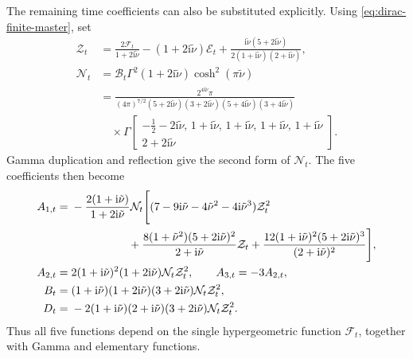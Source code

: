 \documentclass[a4paper,12pt]{article}
\def\ii{\mathrm{i}}
\begin{document}
The remaining time coefficients can also be substituted explicitly.
Using \eqref{eq:dirac-finite-master}, set
\begin{align}
 \mathcal Z_t&=\frac{2\mathcal F_t}{1+2\ii\tilde\nu}
 -(1+2\ii\tilde\nu)\mathcal E_t
 +\frac{\ii\tilde\nu(5+2\ii\tilde\nu)}
 {2(1+\ii\tilde\nu)(2+\ii\tilde\nu)},\nonumber\\
 \mathcal N_t&=\mathcal B_t\Gamma^2(1+2\ii\tilde\nu)
 \cosh^2(\pi\tilde\nu)\nonumber\\
 &=\frac{2^{4\ii\tilde\nu}\pi}
 {(4\pi)^{7/2}
 (5+2\ii\tilde\nu)(3+2\ii\tilde\nu)
 (5+4\ii\tilde\nu)(3+4\ii\tilde\nu)}
 \nonumber\\
 &\quad\times\Gamma\!\left[\begin{matrix}
 -\tfrac12-2\ii\tilde\nu,\,1+\ii\tilde\nu,\,1+\ii\tilde\nu,\,
 1+\ii\tilde\nu,\,1+\ii\tilde\nu\\
 2+2\ii\tilde\nu
 \end{matrix}\right].
 \label{eq:top-angular-explicit-common}
\end{align}
Gamma duplication and reflection give the second form of $\mathcal N_t$.
The five coefficients then become
\begin{align}
 A_{1,t}={}&-\frac{2(1+\ii\tilde\nu)}{1+2\ii\tilde\nu}\mathcal N_t
 \Bigg[(7-9\ii\tilde\nu-4\tilde\nu^2-4\ii\tilde\nu^3)\mathcal Z_t^2
 \nonumber\\
 &\hspace{18mm}
 +\frac{8(1+\tilde\nu^2)(5+2\ii\tilde\nu)^2}{2+\ii\tilde\nu}\mathcal Z_t
 +\frac{12(1+\ii\tilde\nu)^2(5+2\ii\tilde\nu)^3}{(2+\ii\tilde\nu)^2}
 \Bigg],\nonumber\\
 A_{2,t}={}&2(1+\ii\tilde\nu)^2(1+2\ii\tilde\nu)\mathcal N_t\mathcal Z_t^2,
 \qquad A_{3,t}=-3A_{2,t},\nonumber\\
 B_t={}&(1+\ii\tilde\nu)(1+2\ii\tilde\nu)(3+2\ii\tilde\nu)
 \mathcal N_t\mathcal Z_t^2,\nonumber\\
 D_t={}&-2(1+\ii\tilde\nu)(2+\ii\tilde\nu)(3+2\ii\tilde\nu)
 \mathcal N_t\mathcal Z_t^2.
 \label{eq:top-angular-explicit-finite}
\end{align}
Thus all five functions depend on the single hypergeometric function $\mathcal F_t$, together with Gamma and elementary functions.

\clearpage


\end{document}
